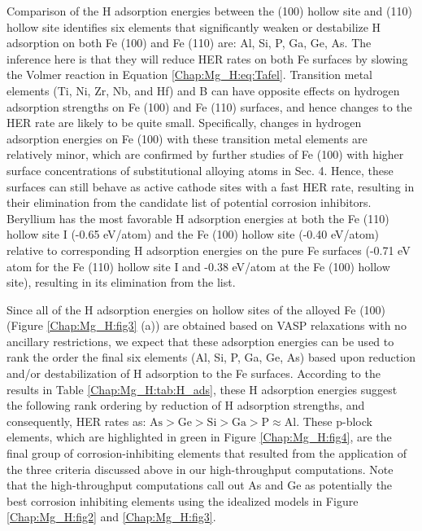 Comparison of the H adsorption energies between the (100) hollow site and (110) hollow site identifies six elements that significantly weaken or destabilize H adsorption on both Fe (100) and Fe (110) are: Al, Si, P, Ga, Ge, As. The inference here is that they will reduce \ac{HER} rates on both Fe surfaces by slowing the Volmer reaction in Equation \ref{Chap:Mg_H:eq:Tafel}. Transition metal elements (Ti, Ni, Zr, Nb, and Hf) and B can have opposite effects on hydrogen adsorption strengths on Fe (100) and Fe (110) surfaces, and hence changes to the \ac{HER} rate are likely to be quite small. Specifically, changes in hydrogen adsorption energies on Fe (100) with these transition metal elements are relatively minor, which are confirmed by further studies of Fe (100) with higher surface concentrations of substitutional alloying atoms in Sec. 4. Hence, these surfaces can still behave as active cathode sites with a fast \ac{HER} rate, resulting in their elimination from the candidate list of potential corrosion inhibitors. Beryllium has the most favorable H adsorption energies at both the Fe (110) hollow site I (-0.65 eV/atom) and the Fe (100) hollow site (-0.40 eV/atom) relative to corresponding H adsorption energies on the pure Fe surfaces (-0.71 eV atom for the Fe (110) hollow site I and -0.38 eV/atom at the Fe (100) hollow site), resulting in its elimination from the list.


Since all of the H adsorption energies on hollow sites of the alloyed Fe (100) (Figure \ref{Chap:Mg_H:fig3} (a)) are obtained based on VASP relaxations with no ancillary restrictions, we expect that these adsorption energies can be used to rank the order the final six elements (Al, Si, P, Ga, Ge, As) based upon reduction and/or destabilization of H adsorption to the Fe surfaces. According to the results in Table \ref{Chap:Mg_H:tab:H_ads}, these H adsorption energies suggest the following rank ordering by reduction of H adsorption strengths, and consequently, HER rates as: $\text{As} > \text{Ge} > \text{Si} > \text{Ga} > \text{P} \approx \text{Al}$. These p-block elements, which are highlighted in green in Figure \ref{Chap:Mg_H:fig4}, are the final group of corrosion-inhibiting elements that resulted from the application of the three criteria discussed above in our high-throughput computations. Note that the high-throughput computations call out As and Ge as potentially the best corrosion inhibiting elements using the idealized models in Figure \ref{Chap:Mg_H:fig2} and \ref{Chap:Mg_H:fig3}.


